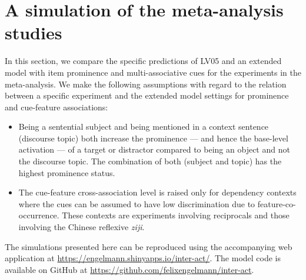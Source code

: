 \documentclass{cambridge7A}\usepackage[]{graphicx}\usepackage[]{color}
\begin{document}
\section{A simulation of the meta-analysis studies}
\label{sec:sims}
In this section, we compare the specific predictions of LV05 and an extended model with item prominence and multi-associative cues for the experiments in the \cite{JaegerEngelmannVasishth2017} meta-analysis.
We make the following assumptions with regard to the relation between a specific experiment and the extended model settings for prominence and cue-feature associations:
\begin{itemize}
	\item Being a sentential subject and being mentioned in a context sentence (discourse topic) both increase the prominence --- and hence the base-level activation --- of a target or distractor compared to being an object and not the discourse topic. The combination of both (subject and topic) has the highest prominence status.
	\item The cue-feature cross-association level is raised only for dependency contexts where the cues can be assumed to have low discrimination due to feature-co-occurrence. These contexts are experiments involving reciprocals and those involving the Chinese reflexive \textit{ziji}. 
\end{itemize}

The simulations presented here can be reproduced using the accompanying web application at \url{https://engelmann.shinyapps.io/inter-act/}.
The model code is available on GitHub at \url{https://github.com/felixengelmann/inter-act}.


\end{document}
